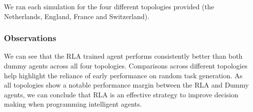 \documentclass[11pt]{article}
\begin{document}
We ran each simulation for the four different topologies provided (the Netherlands, England, France and Switzerland).\\

\subsubsection{Observations}
We can see that the RLA trained agent performs consistently better than both dummy agents across all four topologies. Comparisons across different topologies help highlight the reliance of early performance on random task generation. As all topologies show a notable performance margin between the RLA and Dummy agents, we can conclude that RLA is an effective strategy to improve decision making when programming intelligent agents.
\end{document}
